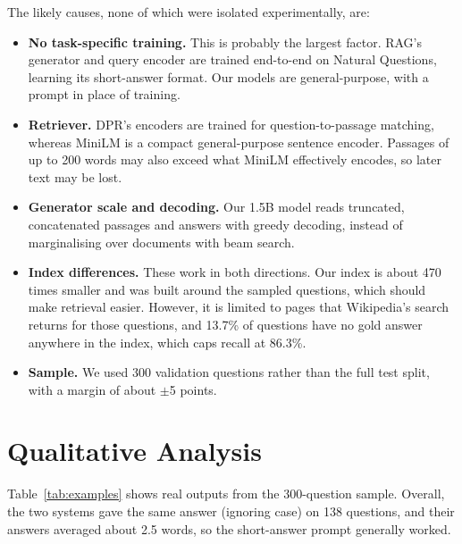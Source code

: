 \documentclass[11pt,a4paper]{article}
\begin{document}
The likely causes, none of which were isolated experimentally, are:
\begin{itemize}
    \item \textbf{No task-specific training.} This is probably the largest factor. RAG's generator and query encoder are trained end-to-end on Natural Questions, learning its short-answer format. Our models are general-purpose, with a prompt in place of training.
    \item \textbf{Retriever.} DPR's encoders are trained for question-to-passage matching, whereas MiniLM is a compact general-purpose sentence encoder. Passages of up to 200 words may also exceed what MiniLM effectively encodes, so later text may be lost.
    \item \textbf{Generator scale and decoding.} Our 1.5B model reads truncated, concatenated passages and answers with greedy decoding, instead of marginalising over documents with beam search.
    \item \textbf{Index differences.} These work in both directions. Our index is about 470 times smaller and was built around the sampled questions, which should make retrieval easier. However, it is limited to pages that Wikipedia's search returns for those questions, and 13.7\% of questions have no gold answer anywhere in the index, which caps recall at 86.3\%.
    \item \textbf{Sample.} We used 300 validation questions rather than the full test split, with a margin of about $\pm$5 points.
\end{itemize}

\section{Qualitative Analysis}
\label{sec:qualitative}

Table~\ref{tab:examples} shows real outputs from the 300-question sample. Overall, the two systems gave the same answer (ignoring case) on 138 questions, and their answers averaged about 2.5 words, so the short-answer prompt generally worked.
\end{document}
